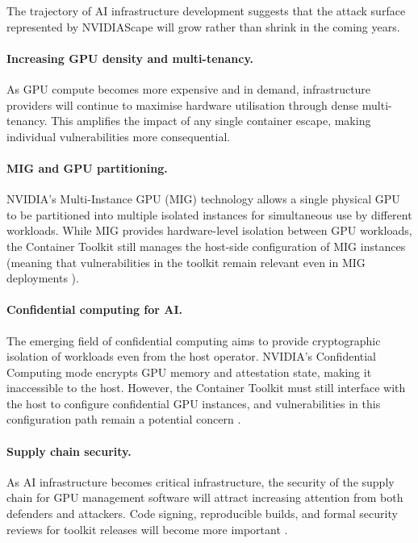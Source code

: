 The trajectory of AI infrastructure development suggests that the attack surface represented by NVIDIAScape will grow rather than shrink in the coming years.
 
\paragraph{Increasing GPU density and multi-tenancy.} As GPU compute becomes more expensive and in demand, infrastructure providers will continue to maximise hardware utilisation through dense multi-tenancy. This amplifies the impact of any single container escape, making individual vulnerabilities more consequential.
 
\paragraph{MIG and GPU partitioning.} NVIDIA's Multi-Instance GPU (MIG) technology allows a single physical GPU to be partitioned into multiple isolated instances for simultaneous use by different workloads. While MIG provides hardware-level isolation between GPU workloads, the Container Toolkit still manages the host-side configuration of MIG instances (meaning that vulnerabilities in the toolkit remain relevant even in MIG deployments \cite{nvidia_mig_docs}).
 
\paragraph{Confidential computing for AI.} The emerging field of confidential computing aims to provide cryptographic isolation of workloads even from the host operator. NVIDIA's Confidential Computing mode encrypts GPU memory and attestation state, making it inaccessible to the host. However, the Container Toolkit must still interface with the host to configure confidential GPU instances, and vulnerabilities in this configuration path remain a potential concern \cite{nvidia_confidential_compute}.
 
\paragraph{Supply chain security.} As AI infrastructure becomes critical infrastructure, the security of the supply chain for GPU management software will attract increasing attention from both defenders and attackers. Code signing, reproducible builds, and formal security reviews for toolkit releases will become more important \cite{nvidia_ctk_github}.
 
